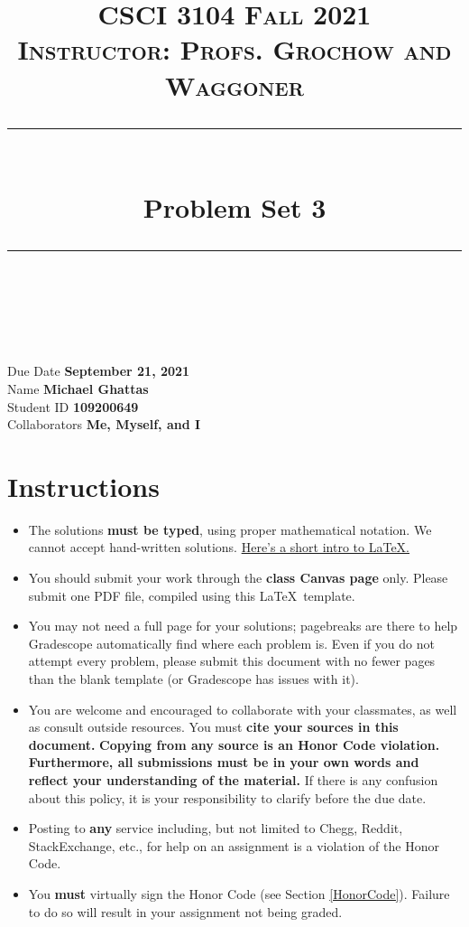 \documentclass[11pt]{article}
\title{
\normalfont \normalsize 
\textsc{CSCI 3104 Fall 2021 \\ 
Instructor: Profs. Grochow and Waggoner} \\
[10pt] 
\rule{\linewidth}{0.5pt} \\[6pt] 
\huge Problem Set 3 \\
\rule{\linewidth}{2pt}  \\[10pt]
}
\date{}
\theoremstyle{definition}
\theoremstyle{definition}
\theoremstyle{definition}
\begin{document}

\maketitle


\noindent
Due Date \dotfill \textbf{September 21, 2021} \\
Name \dotfill \textbf{Michael Ghattas} \\
Student ID \dotfill \textbf{109200649} \\
Collaborators \dotfill \textbf{Me, Myself, and I}

\tableofcontents

\section{Instructions}
 \begin{itemize}
	\item The solutions \textbf{must be typed}, using proper mathematical notation. We cannot accept hand-written solutions. \href{http://ece.uprm.edu/~caceros/latex/introduction.pdf}{Here's a short intro to \LaTeX.}
	\item You should submit your work through the \textbf{class Canvas page} only. Please submit one PDF file, compiled using this \LaTeX \ template.
	\item You may not need a full page for your solutions; pagebreaks are there to help Gradescope automatically find where each problem is. Even if you do not attempt every problem, please submit this document with no fewer pages than the blank template (or Gradescope has issues with it).

	\item You are welcome and encouraged to collaborate with your classmates, as well as consult outside resources. You must \textbf{cite your sources in this document.} \textbf{Copying from any source is an Honor Code violation. Furthermore, all submissions must be in your own words and reflect your understanding of the material.} If there is any confusion about this policy, it is your responsibility to clarify before the due date. 

	\item Posting to \textbf{any} service including, but not limited to Chegg, Reddit, StackExchange, etc., for help on an assignment is a violation of the Honor Code.

	\item You \textbf{must} virtually sign the Honor Code (see Section \ref{HonorCode}). Failure to do so will result in your assignment not being graded.
\end{itemize}
\end{document}
